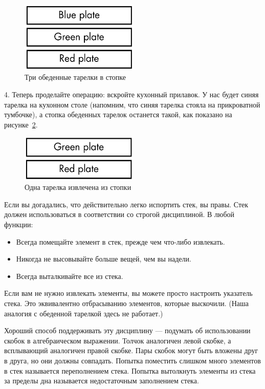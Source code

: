 \begin{figure}[htbp]
    \centering
    \includegraphics[width=0.5\textwidth]{img/fig11-1.png}
    \caption{Три обеденные тарелки в стопке}
    \label{fig11-1}
\end{figure}

4. Теперь проделайте операцию: вскройте кухонный прилавок. У нас будет синяя тарелка на кухонном столе (напомним, что синяя тарелка стояла на прикроватной тумбочке), а стопка обеденных тарелок останется такой, как показано на рисунке~\ref{fig11-2}.

\begin{figure}[htbp]
    \centering
    \includegraphics[width=0.5\textwidth]{img/fig11-2.png}
    \caption{Одна тарелка извлечена из стопки}
    \label{fig11-2}
\end{figure}

Если вы догадались, что действительно легко испортить стек, вы правы. Стек должен использоваться в соответствии со строгой дисциплиной. В любой функции:

\begin{itemize}
    \item Всегда помещайте элемент в стек, прежде чем что-либо извлекать.
    \item Никогда не высовывайте больше вещей, чем вы надели.
    \item Всегда выталкивайте все из стека.
\end{itemize}

Если вам не нужно извлекать элементы, вы можете просто настроить указатель стека. Это эквивалентно отбрасыванию элементов, которые выскочили. (Наша аналогия с обеденной тарелкой здесь не работает.)

Хороший способ поддерживать эту дисциплину — подумать об использовании скобок в алгебраическом выражении. Толчок аналогичен левой скобке, а всплывающий аналогичен правой скобке. Пары скобок могут быть вложены друг в друга, но они должны совпадать. Попытка поместить слишком много элементов в стек называется переполнением стека. Попытка вытолкнуть элементы из стека за пределы дна называется недостаточным заполнением стека.

